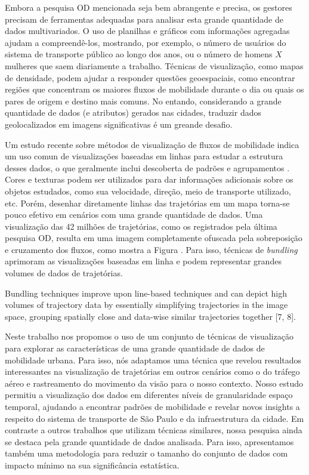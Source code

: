 Embora a pesquisa OD mencionada seja bem abrangente e precisa, 
os gestores precisam de ferramentas adequadas para analisar esta grande quantidade de
dados multivariados. O uso de planilhas e gráficos com informações agregadas
ajudam a compreendê-los, mostrando, por exemplo, o número de usuários 
do sistema de transporte público ao longo dos anos, ou o número de homens ${X}$ mulheres
que saem diariamente a trabalho. Técnicas de visualização, como mapas de densidade,
podem ajudar a responder questões geoespaciais, como encontrar regiões que concentram
os maiores fluxos de mobilidade durante o dia ou quais os pares de origem e destino
mais comuns. No entando, considerando a grande quantidade de dados (e atributos) gerados
nas cidades, traduzir dados geolocalizados em imagens significativas é um greande desafio.

Um estudo recente sobre métodos de visualização de fluxos de mobilidade indica um
uso comun de visualizações baseadas em linhas para estudar a estrutura desses dados,
o que geralmente inclui descoberta de padrões e agrupamentos \cite{Chen2015}. Cores e texturas
podem ser utilizados para dar informações adicionais sobre os objetos estudados, como sua velocidade, direção,
meio de transporte utilizado, etc. Porém, desenhar diretamente linhas das trajetórias em um mapa
torna-se pouco efetivo em cenários com uma grande quantidade de dados. Uma visualização das 42 milhões de trajetórias,
como os registrados pela última pesquisa OD, resulta em uma imagem completamente ofuscada
pela sobreposição e cruzamento dos fluxos, como mostra a Figura \cite{fig:cluttered-graph}.
Para isso, técnicas de \emph{bundling} aprimoram as visualizações baseadas em linha e podem
representar grandes volumes de dados de trajetórias.

Bundling techniques improve upon line-based techniques and can
depict high volumes of trajectory data by essentially simplifying trajectories in the
image space, grouping spatially close and data-wise similar trajectories together [7,
8].




Neste trabalho nos propomos o uso de um conjunto de técnicas de visualização
para explorar as características de uma grande quantidade de dados de
mobilidade urbana. Para isso, nós adaptamos uma técnica que revelou resultados
interessantes na visualização de trajetórias em outros cenários como o do
tráfego aéreo e rastreamento do movimento da visão para o nosso contexto.
Nosso estudo permitiu a visualização dos dados em diferentes níveis de
granularidade espaço temporal, ajudando a encontrar padrões de mobilidade e
revelar novos insights a respeito do sistema de transporte de S\~ao Paulo e da
infraestrutura da cidade. Em contraste a outros trabalhos que utilizam técnicas
similares, nossa pesquisa ainda se destaca pela grande quantidade de dados
analisada. Para isso, apresentamos também uma metodologia para reduzir o tamanho
do conjunto de dados com impacto mínimo na sua significância estatística.
